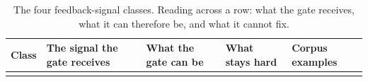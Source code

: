 \documentclass[
  11pt,
]{article}
\begin{document}
\begin{table}[htbp]
\caption{The four feedback-signal classes. Reading across a row: what the gate receives, what it can therefore be, and what it cannot fix.}\label{tab:IV-1}
\centering\small
\begin{tabular}{@{}
  >{\raggedright\arraybackslash}p{}
  >{\raggedright\arraybackslash}p{}
  >{\raggedright\arraybackslash}p{}
  >{\raggedright\arraybackslash}p{}
  >{\raggedright\arraybackslash}p{}@{}}
\toprule\noalign{}
\begin{minipage}[b]{\linewidth}\raggedright
Class
\end{minipage} & \begin{minipage}[b]{\linewidth}\raggedright
The signal the gate receives
\end{minipage} & \begin{minipage}[b]{\linewidth}\raggedright
What the gate can be
\end{minipage} & \begin{minipage}[b]{\linewidth}\raggedright
What stays hard
\end{minipage} & \begin{minipage}[b]{\linewidth}\raggedright
Corpus examples
\end{minipage} \\
\midrule\noalign{}



\end{tabular}
\end{table}
\end{document}
